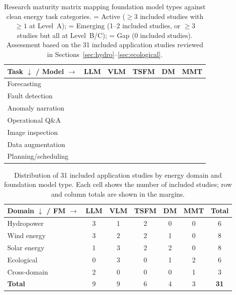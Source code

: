 \documentclass[preprint,12pt]{elsarticle}
\newcommand{\fullcirc}[1]{\textcolor{green!60!black}{\textbullet\textbullet\textbullet}}
\newcommand{\halfcirc}[1]{\textcolor{orange!80!black}{\textbullet\textbullet}}
\newcommand{\emptycirc}[1]{\textcolor{red!60!black}{\textbullet}}
\begin{document}
\begin{table}[htbp]
\centering
\caption{Research maturity matrix mapping foundation model types against clean energy task categories. \fullcirc{} = Active ($\geq 3$ included studies with $\geq 1$ at Level~A); \halfcirc{} = Emerging (1--2 included studies, or $\geq 3$ studies but all at Level~B/C); \emptycirc{} = Gap (0 included studies). Assessment based on the 31 included application studies reviewed in Sections~\ref{sec:hydro}--\ref{sec:ecological}.}
\label{fig:taxonomy_heatmap}
\small
\def\fullmark{\textcolor{green!60!black}{\textbullet\textbullet\textbullet}}
\def\halfmark{\textcolor{orange!80!black}{\textbullet\textbullet}}
\def\gapmark{\textcolor{red!60!black}{\textbullet}}
\begin{tabular}{@{}lccccc@{}}
\toprule
\textbf{Task $\downarrow$ / Model $\rightarrow$} & \textbf{LLM} & \textbf{VLM} & \textbf{TSFM} & \textbf{DM} & \textbf{MMT} \\
\midrule
Forecasting         & \halfmark & \gapmark  & \fullmark & \gapmark  & \gapmark \\
Fault detection     & \fullmark & \halfmark & \halfmark & \halfmark & \gapmark \\
Anomaly narration   & \halfmark & \gapmark  & \gapmark  & \gapmark  & \gapmark \\
Operational Q\&A    & \fullmark & \gapmark  & \gapmark  & \gapmark  & \halfmark \\
Image inspection    & \gapmark  & \fullmark & \gapmark  & \halfmark & \halfmark \\
Data augmentation   & \gapmark  & \halfmark & \halfmark & \fullmark & \gapmark \\
Planning/scheduling & \halfmark & \gapmark  & \gapmark  & \gapmark  & \gapmark \\
\bottomrule
\end{tabular}
\end{table}

\begin{table}[htbp]
\centering
\caption{Distribution of 31 included application studies by energy domain and foundation model type. Each cell shows the number of included studies; row and column totals are shown in the margins.}
\label{tab:study_distribution}
\small
\begin{tabular}{@{}lccccc|c@{}}
\toprule
\textbf{Domain $\downarrow$ / FM $\rightarrow$} & \textbf{LLM} & \textbf{VLM} & \textbf{TSFM} & \textbf{DM} & \textbf{MMT} & \textbf{Total} \\
\midrule
Hydropower       & 3 & 1 & 2 & 0 & 0 & 6 \\
Wind energy      & 3 & 2 & 2 & 1 & 0 & 8 \\
Solar energy     & 1 & 3 & 2 & 2 & 0 & 8 \\
Ecological       & 0 & 3 & 0 & 1 & 2 & 6 \\
Cross-domain     & 2 & 0 & 0 & 0 & 1 & 3 \\
\midrule
\textbf{Total}   & 9 & 9 & 6 & 4 & 3 & \textbf{31} \\
\bottomrule
\end{tabular}
\end{table}
\end{document}
